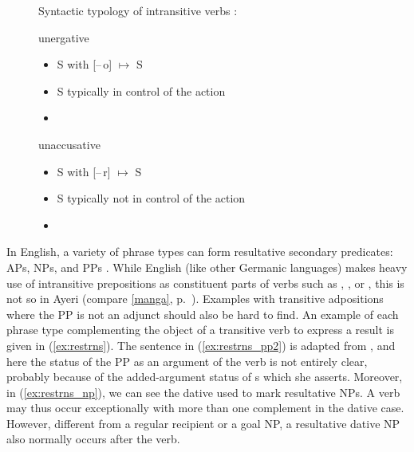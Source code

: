 \begin{figure}
\pex\label{ex:verbtyp}%
Syntactic typology of intransitive verbs
\parencites{perlmutter1978}{bresnan2016}:
\a \begin{minipage}[t]{\remaining}
	unergative
	\begin{itemize}[leftmargin=*]
		\item S with [–\,o] $\mapsto$ S
		\item S typically in control of the action
		\item {}
	\end{itemize}
	\end{minipage}

\a \begin{minipage}[t]{\remaining}
	unaccusative
	\begin{itemize}[leftmargin=*]
		\item S with [–\,r] $\mapsto$ S
		\item S typically not in control of the action
		\item {}
	\end{itemize}
	\end{minipage}
\xe
\end{figure}

In English, a variety of phrase types can form resultative
secondary predicates: APs, NPs, and PPs \parencites{simpson1983}{christie2013}.
While English (like other Germanic languages) makes heavy use of intransitive
prepositions as constituent parts of verbs such as , , or , this is not so in Ayeri (compare \autoref{manga},
p.~\pageref{manga}). Examples with transitive
adpositions where the PP is not an
adjunct should also be hard to find. An
example of each phrase type complementing the object of a transitive verb to
express a result is given in (\ref{ex:restrns}). The sentence in
(\ref{ex:restrns_pp2}) is adapted from \citet{christie2013}, and here the
status of the PP as an argument of the
verb is not entirely clear, probably because of the added-argument status of
\XCompl{}s which she asserts.
Moreover, in (\ref{ex:restrns_np}), we can see the dative
used to mark resultative NPs. A verb may thus
occur exceptionally with more than one complement in the dative
case. However, different from a regular recipient or a goal
NP, a resultative dative NP
also normally occurs after the verb.

